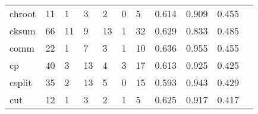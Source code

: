 \begin{longtable}{lp{1.2cm}p{1.2cm}p{1.2cm}p{1.2cm}p{1.2cm}p{1.2cm}p{1.2cm}p{1.2cm}p{1.2cm}p{1.2cm}}
chroot    &                                    11 &                                                  1 &                                                  3 &                                                  2 &                                                  0 &                                                  5 &                                              0.614 &                                              0.909 &                                              0.455 \\
cksum     &                                    66 &                                                 11 &                                                  9 &                                                 13 &                                                  1 &                                                 32 &                                              0.629 &                                              0.833 &                                              0.485 \\
comm      &                                    22 &                                                  1 &                                                  7 &                                                  3 &                                                  1 &                                                 10 &                                              0.636 &                                              0.955 &                                              0.455 \\
cp        &                                    40 &                                                  3 &                                                 13 &                                                  4 &                                                  3 &                                                 17 &                                              0.613 &                                              0.925 &                                              0.425 \\
csplit    &                                    35 &                                                  2 &                                                 13 &                                                  5 &                                                  0 &                                                 15 &                                              0.593 &                                              0.943 &                                              0.429 \\
cut       &                                    12 &                                                  1 &                                                  3 &                                                  2 &                                                  1 &                                                  5 &                                              0.625 &                                              0.917 &                                              0.417 \\

\end{longtable}

